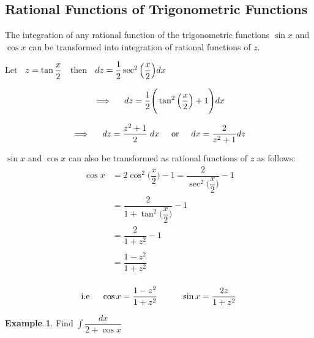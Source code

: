 \documentclass[11pt,a4paper]{article}
\theoremstyle{definition}
\newtheorem{exa}[thm]{Example}
\begin{document}
\subsection{Rational Functions of Trigonometric Functions}
The integration of any rational function of the trigonometric functions $\sin x$ and $\cos x$ can be transformed into integration of rational functions of $z$.


Let $\hspace{0.2cm} z = \tan \dfrac{x}{2}\hspace{0.2cm}$ then $\hspace{0.2cm} dz = \dfrac{1}{2}\sec^2 \Big(\dfrac{x}{2}\Big)dx$

$$\implies\hspace{0.4cm} dz = \dfrac{1}{2}\Bigg( \tan^2\Big(\dfrac{x}{2}\Big) + 1 \Bigg) dx$$


$$\implies \hspace{0.4cm}  dz = \dfrac{z^2 + 1}{2}\hspace{0.1cm} dx \hspace{0.5cm} \text{or}\hspace{0.5cm} dx = \dfrac{2}{z^2 + 1}dz$$


$\sin x$ and $\cos x$ can also be transformed as rational functions of $z$ as follows:
\begin{align*}
\cos x & = 2 \cos^2\Big(\dfrac{x}{2}\Big) - 1 = \dfrac{2}{\sec^2\Big(\dfrac{x}{2}\Big)} - 1\\
& = \dfrac{2}{1 + \tan^2\Big(\dfrac{x}{2}\Big)} - 1 \\
& = \dfrac{2}{1 + z^2} - 1\\\\
& = \dfrac{1 - z^2}{1 + z^2}\\
\end{align*}

$$\text{i.e}\hspace{0.5cm} \cos x = \dfrac{1 - z^2}{1 + z^2}\hspace{1cm} \sin x = \dfrac{2z}{1 + z^2}$$


\begin{exa}


Find $\displaystyle{\int \dfrac{dx}{2 + \cos x}}$
\end{exa}
\end{document}

